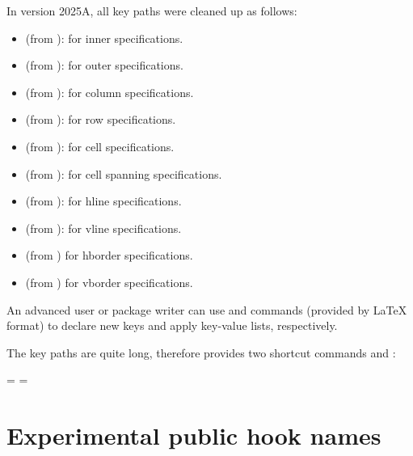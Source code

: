 \documentclass[oneside]{book}
\begin{document}
{In version 2025A, all  key paths were cleaned up as follows:
\begin{itemize}[nosep]
  \item {} (from ): for inner specifications.
  \item {} (from ): for outer specifications.
  \item {} (from ): for column specifications.
  \item {} (from ): for row specifications.
  \item {} (from ): for cell specifications.
  \item {} (from ): for cell spanning specifications.
  \item {} (from ): for hline specifications.
  \item {} (from ): for vline specifications.
  \item {} (from ) for hborder specifications.
  \item {} (from ) for vborder specifications.
\end{itemize}
An advanced user or package writer can use \CC{\DeclareKeys} and \CC{\SetKeys} commands
(provided by LaTeX format) to declare new keys and apply key-value lists, respectively.

The key paths are quite long, therefore  provides two shortcut commands
\CC{\DeclareTblrKeys} and \CC{\SetTblrKeys}:

\begin{codehigh}
 = 
 = 
\end{codehigh}

\section{Experimental public hook names}
\label{sect:hook}

}
\end{document}
